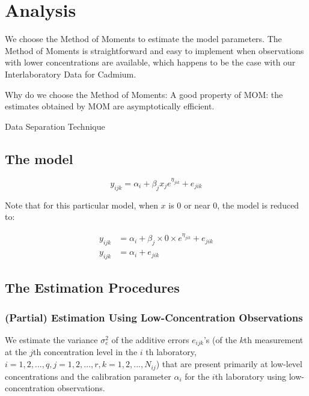 \documentclass[12pt,]{article}
\begin{document}
\section{Analysis}\label{analysis}

We choose the Method of Moments to estimate the model parameters. The
Method of Moments is straightforward and easy to implement when
observations with lower concentrations are available, which happens to
be the case with our Interlaboratory Data for Cadmium.

Why do we choose the Method of Moments: A good property of MOM: the
estimates obtained by MOM are asymptotically efficient.

Data Separation Technique

\subsection{The model}\label{the-model}

\begin{equation}
y_{ijk} = \alpha_i + \beta_j x_j e^{\eta_{jik}} + e_{jik}
\end{equation}

Note that for this particular model, when \(x\) is 0 or near 0, the
model is reduced to:

\begin{align}
y_{ijk} &= \alpha_i + \beta_j \times 0 \times e^{\eta_{jik}} + e_{jik} \\
y_{ijk} &= \alpha_i + e_{jik} 
\end{align}

\subsection{The Estimation Procedures}\label{the-estimation-procedures}

\subsubsection{(Partial) Estimation Using Low-Concentration
Observations}\label{partial-estimation-using-low-concentration-observations}

We estimate the variance \(\sigma_e^2\) of the additive errors
\(e_{ijk}\)'s (of the \(k\)th measurement at the \(j\)th concentration
level in the \(i\) th laboratory,
\(i=1,2,...,q, j = 1,2,...,r, k=1,2,...,N_{ij}\)) that are present
primarily at low-level concentrations and the calibration parameter
\(\alpha_i\) for the \(i\)th laboratory using low-concentration
observations.
\end{document}
